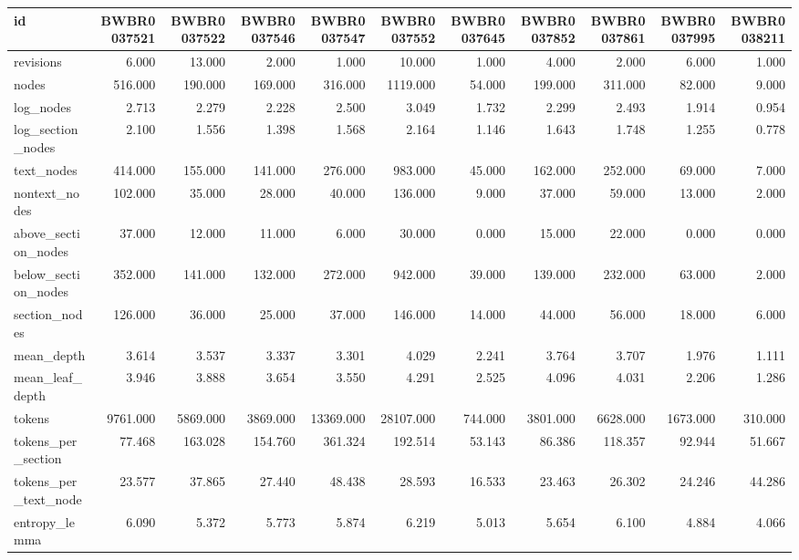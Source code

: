 \begin{tabular}{lrrrrrrrrrr}
\toprule
id & BWBR0037521 & BWBR0037522 & BWBR0037546 & BWBR0037547 & BWBR0037552 & BWBR0037645 & BWBR0037852 & BWBR0037861 & BWBR0037995 & BWBR0038211 \\
\midrule
revisions & 6.000 & 13.000 & 2.000 & 1.000 & 10.000 & 1.000 & 4.000 & 2.000 & 6.000 & 1.000 \\
\cline{1-11}
nodes & 516.000 & 190.000 & 169.000 & 316.000 & 1119.000 & 54.000 & 199.000 & 311.000 & 82.000 & 9.000 \\
\cline{1-11}
log\_nodes & 2.713 & 2.279 & 2.228 & 2.500 & 3.049 & 1.732 & 2.299 & 2.493 & 1.914 & 0.954 \\
\cline{1-11}
log\_section\_nodes & 2.100 & 1.556 & 1.398 & 1.568 & 2.164 & 1.146 & 1.643 & 1.748 & 1.255 & 0.778 \\
\cline{1-11}
text\_nodes & 414.000 & 155.000 & 141.000 & 276.000 & 983.000 & 45.000 & 162.000 & 252.000 & 69.000 & 7.000 \\
\cline{1-11}
nontext\_nodes & 102.000 & 35.000 & 28.000 & 40.000 & 136.000 & 9.000 & 37.000 & 59.000 & 13.000 & 2.000 \\
\cline{1-11}
above\_section\_nodes & 37.000 & 12.000 & 11.000 & 6.000 & 30.000 & 0.000 & 15.000 & 22.000 & 0.000 & 0.000 \\
\cline{1-11}
below\_section\_nodes & 352.000 & 141.000 & 132.000 & 272.000 & 942.000 & 39.000 & 139.000 & 232.000 & 63.000 & 2.000 \\
\cline{1-11}
section\_nodes & 126.000 & 36.000 & 25.000 & 37.000 & 146.000 & 14.000 & 44.000 & 56.000 & 18.000 & 6.000 \\
\cline{1-11}
mean\_depth & 3.614 & 3.537 & 3.337 & 3.301 & 4.029 & 2.241 & 3.764 & 3.707 & 1.976 & 1.111 \\
\cline{1-11}
mean\_leaf\_depth & 3.946 & 3.888 & 3.654 & 3.550 & 4.291 & 2.525 & 4.096 & 4.031 & 2.206 & 1.286 \\
\cline{1-11}
tokens & 9761.000 & 5869.000 & 3869.000 & 13369.000 & 28107.000 & 744.000 & 3801.000 & 6628.000 & 1673.000 & 310.000 \\
\cline{1-11}
tokens\_per\_section & 77.468 & 163.028 & 154.760 & 361.324 & 192.514 & 53.143 & 86.386 & 118.357 & 92.944 & 51.667 \\
\cline{1-11}
tokens\_per\_text\_node & 23.577 & 37.865 & 27.440 & 48.438 & 28.593 & 16.533 & 23.463 & 26.302 & 24.246 & 44.286 \\
\cline{1-11}
entropy\_lemma & 6.090 & 5.372 & 5.773 & 5.874 & 6.219 & 5.013 & 5.654 & 6.100 & 4.884 & 4.066 \\

\end{tabular}

